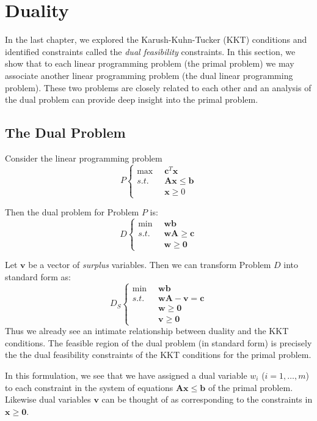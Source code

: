 \chapter{Duality}
In the last chapter, we explored the Karush-Kuhn-Tucker (KKT) conditions and identified constraints called the \textit{dual feasibility} constraints. In this section, we show that to each linear programming problem (the primal problem) we may associate another linear programming problem (the dual linear programming problem). These two problems are closely related to each other and an analysis of the dual problem can provide deep insight into the primal problem. 


\section{The Dual Problem}
Consider the linear programming problem 
\begin{equation}
P\left\{
\begin{aligned}
\max\;\; & \mathbf{c}^T\mathbf{x}\\
s.t.\;\; & \mathbf{A}\mathbf{x} \leq \mathbf{b}\\
& \mathbf{x} \geq 0
\end{aligned}\right.
\end{equation}

Then the dual problem for Problem $P$ is:
\begin{equation}
D\left\{
\begin{aligned}
\min\;\; & \mathbf{w}\mathbf{b}\\
s.t.\;\; & \mathbf{w}\mathbf{A} \geq \mathbf{c}\\
& \mathbf{w} \geq \mathbf{0}
\end{aligned}\right.
\end{equation}

\begin{remark} Let $\mathbf{v}$ be a vector of \textit{surplus} variables. Then we can transform Problem $D$ into standard form as:
\begin{equation}
D_S\left\{
\begin{aligned}
\min\;\; & \mathbf{w}\mathbf{b}\\
s.t.\;\; & \mathbf{w}\mathbf{A} - \mathbf{v} = \mathbf{c}\\
& \mathbf{w} \geq \mathbf{0}\\
& \mathbf{v} \geq \mathbf{0}
\end{aligned}\right.
\end{equation}
Thus we already see an intimate relationship between duality and the KKT conditions. The feasible region of the dual problem (in standard form) is precisely the the dual feasibility constraints of the KKT conditions for the primal problem.

In this formulation, we see that we have assigned a dual variable $w_i$ ($i=1,\dots,m$) to each constraint in the system of equations $\mathbf{A}\mathbf{x} \leq \mathbf{b}$ of the primal problem. Likewise dual variables $\mathbf{v}$ can be thought of as corresponding to the constraints in $\mathbf{x} \geq \mathbf{0}$. 
\end{remark}

